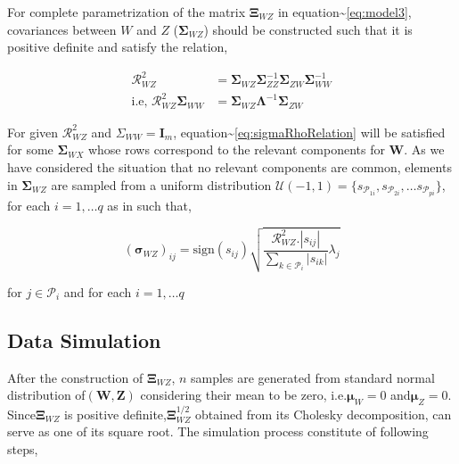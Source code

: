 \documentclass[12pt,A4paper,authoryear]{elsarticle} %
\begin{document}
For complete parametrization of the matrix \(\boldsymbol{\Xi}_{WZ}\) in
equation\textasciitilde{}\eqref{eq:model3}, covariances between \(W\) and
\(Z\) (\(\boldsymbol{\Sigma}_{WZ}\)) should be constructed such that it
is positive definite and satisfy the relation,

\begin{align}
  \boldsymbol{\mathcal{R}}^{2}_{WZ}                                      &=
    \boldsymbol{\Sigma}_{WZ}\boldsymbol{\Sigma}^{-1}_{ZZ}\boldsymbol{\Sigma}_{ZW}\boldsymbol{\Sigma}_{WW}^{-1} \nonumber \\
  \text{i.e, } \boldsymbol{\mathcal{R}}_{WZ}^{2}\boldsymbol{\Sigma}_{WW} &=
    \boldsymbol{\Sigma}_{WZ}\boldsymbol{\Lambda}^{-1}\boldsymbol{\Sigma}_{ZW}
\label{eq:sigmaRhoRelation}
\end{align}

For given \(\boldsymbol{\mathcal{R}}_{WZ}^{2}\) and
\(\Sigma_{WW} = \mathbf{I}_m\),
equation\textasciitilde{}\eqref{eq:sigmaRhoRelation} will be satisfied for
some \(\boldsymbol{\Sigma}_{WX}\) whose rows correspond to the relevant
components for \(\mathbf{W}\). As we have considered the situation that
no relevant components are common, elements in
\(\boldsymbol{\Sigma}_{WZ}\) are sampled from a uniform distribution
\(\mathcal{U}(-1, 1) = \{s_{\mathcal{P}_{1i}}, s_{\mathcal{P}_{2i}}, \ldots s_{\mathcal{P}_{pi}}\}\),
for each \(i = 1, \ldots q\) as in \citet{saebo2015simrel} such that,

\[
\left(\boldsymbol{\sigma}_{WZ}\right)_{ij} = \text{sign}\left(s_{ij}\right)
\sqrt{
  \frac
    {\boldsymbol{\mathcal{R}}_{WZ}^{2}.\left|s_{ij}\right|}
    {\sum_{k\in\mathcal{P}_i}{\left|s_{ik}\right|}}
  \lambda_{j}
}
\]

for \(j \in \mathcal{P}_i\) and for each \(i = 1, \ldots q\)

\subsection{Data Simulation}\label{data-simulation}

After the construction of \(\boldsymbol{\Xi}_{WZ}\), \(n\) samples are
generated from standard normal distribution
of\(\left(\mathbf{W}, \mathbf{Z} \right)\) considering their mean to be
zero, i.e.\(\boldsymbol{\mu}_W = 0\) and\(\boldsymbol{\mu}_Z=0\).
Since\(\boldsymbol{\Xi}_{WZ}\) is positive
definite,\(\boldsymbol{\Xi}_{WZ}^{1/2}\) obtained from its Cholesky
decomposition, can serve as one of its square root. The simulation
process constitute of following steps,
\end{document}
